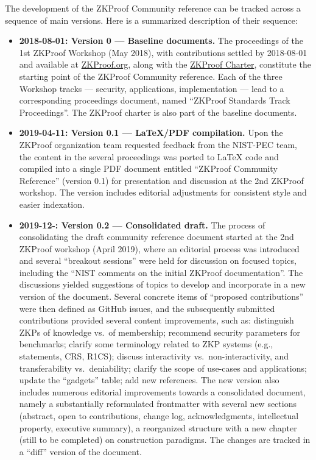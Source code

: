 \label{sec:prelim:change-log}


The development of the ZKProof Community reference can be tracked across a sequence of main versions.
Here is a summarized description of their sequence:

\begin{itemize}\setlength{\itemsep}{1em}

\item \textbf{2018-08-01: Version 0 --- Baseline documents.}
	The proceedings of the 1st ZKProof Workshop (May 2018), 
with contributions settled by 2018-08-01 and available 
at \href{https://zkproof.org/documents}{ZKProof.org},
along with the \hyperref[sec:prelim:charter]{ZKProof Charter}, 
constitute the starting point of the ZKProof Community reference.
	Each of the three Workshop tracks --- security, applications, implementation --- 
lead to a corresponding proceedings document, 
named ``ZKProof Standards  Track Proceedings''.
	The ZKProof charter is also part of the baseline documents.


\item \textbf{2019-04-11: Version 0.1 --- LaTeX/PDF compilation.}
	Upon the ZKProof organization team requested feedback from the NIST-PEC team, the content in the 
several proceedings was ported to LaTeX code and compiled into a single PDF document entitled 
``ZKProof Community Reference'' (version 0.1) for presentation and discussion at the 2nd ZKProof workshop.
	The version includes editorial adjustments for consistent style and easier indexation. %


\item \textbf{2019-12-: Version 0.2 --- Consolidated draft.}
	The process of consolidating the draft community reference document started at the 
2nd ZKProof workshop (April 2019), where an editorial process was introduced and 
several ``breakout sessions'' were held for discussion on focused topics, including
the ``NIST comments on the initial ZKProof documentation''.
	The discussions yielded suggestions of topics to develop and incorporate in a new version of the document.
	Several concrete items of ``proposed contributions'' were then defined as GitHub issues,
and the subsequently submitted contributions provided several content improvements, such as:
	distinguish ZKPs of knowledge vs.\ of membership;
	recommend security parameters for benchmarks;
	clarify some terminology related to ZKP systems (e.g., statements, CRS, R1CS);
	discuss interactivity vs.\ non-interactivity, and transferability vs.\ deniability;
	clarify the scope of use-cases and applications; 
	update the ``gadgets'' table; add new references.
	The new version also includes numerous editorial improvements towards a consolidated document, 
namely a substantially reformulated frontmatter with several new sections
(abstract, open to contributions, change log, acknowledgments, intellectual property, executive summary),
a reorganized structure with a new chapter (still to be completed) on construction paradigms.
	The changes are tracked in a ``diff'' version of the document.
\end{itemize}


